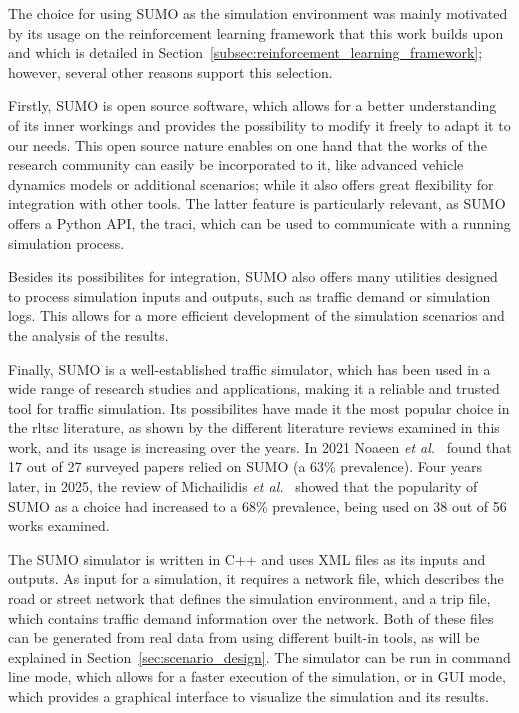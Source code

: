 The choice for using SUMO as the simulation environment was mainly motivated by its usage on the reinforcement learning framework that this work builds upon and which is detailed in Section~\ref{subsec:reinforcement_learning_framework}; however, several other reasons support this selection.

Firstly, SUMO is open source software, which allows for a better understanding of its inner workings and provides the possibility to modify it freely to adapt it to our needs. This open source nature enables on one hand that the works of the research community can easily be incorporated to it, like advanced vehicle dynamics models or additional scenarios; while it also offers great flexibility for integration with other tools. The latter feature is particularly relevant, as SUMO offers a Python API, the \gls{traci}, which can be used to communicate with a running simulation process.

Besides its possibilites for integration, SUMO also offers many utilities designed to process simulation inputs and outputs, such as traffic demand or simulation logs. This allows for a more efficient development of the simulation scenarios and the analysis of the results.

Finally, SUMO is a well-established traffic simulator, which has been used in a wide range of research studies and applications, making it a reliable and trusted tool for traffic simulation. Its possibilites have made it the most popular choice in the \gls{rltsc} literature, as shown by the different literature reviews examined in this work, and its usage is increasing over the years. In 2021 Noaeen \textit{et al.}~\cite{Noaeen2022} found that 17 out of 27 surveyed papers relied on SUMO (a 63\% prevalence). Four years later, in 2025, the review of Michailidis \textit{et al.}~\cite{Michailidis2025} showed that the popularity of SUMO as a choice had increased to a 68\% prevalence, being used on 38 out of 56 works examined.

\medskip

\noindent The SUMO simulator is written in C++ and uses XML files as its inputs and outputs. As input for a simulation, it requires a network file, which describes the road or street network that defines the simulation environment, and a trip file, which contains traffic demand information over the network. Both of these files can be generated from real data from using different built-in tools, as will be explained in Section~\ref{sec:scenario_design}. The simulator can be run in command line mode, which allows for a faster execution of the simulation, or in GUI mode, which provides a graphical interface to visualize the simulation and its results.

